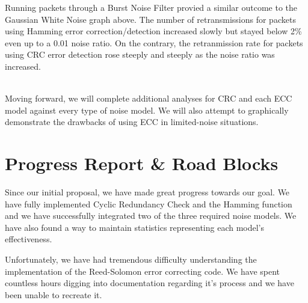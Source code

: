 \documentclass{sigcomm-alternate}
\begin{document}
Running packets through a Burst Noise Filter provied a similar outcome to the Gaussian White Noise graph above. The number of retransmissions for packets using Hamming error correction/detection increased slowly but stayed below 2\% even up to a 0.01 noise ratio. On the contrary, the retranmission rate for packets using CRC error detection rose steeply and steeply as the noise ratio was increased.\\

 \\

Moving forward, we will complete additional analyses for CRC and each ECC model against every type of noise model. We will also attempt to graphically demonstrate the drawbacks of using ECC in limited-noise situations.

\section{Progress Report \& Road Blocks}
Since our initial proposal, we have made great progress towards our goal. We have fully implemented Cyclic Redundancy Check and the Hamming function and we have successfully integrated two of the three required noise models. We have also found a way to maintain statistics representing each model's effectiveness.

Unfortunately, we have had tremendous difficulty understanding the implementation of the Reed-Solomon error correcting code. We have spent countless hours digging into documentation regarding it's process and we have been unable to recreate it.
\end{document}
